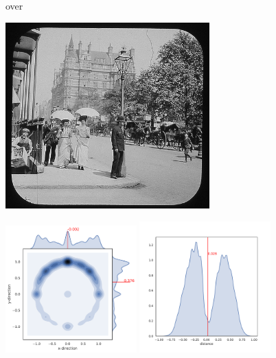 \begin{figure}
	\begin{minipage}{0.1\textwidth}
		\centering
		over
	\end{minipage}%
	\begin{minipage}{0.3\textwidth}
		\centering
		\includegraphics[width=0.7\textwidth]{studies/sc2020/figures/2370756_umbrella_over_woman.jpg}
	\end{minipage}%
	\begin{minipage}{0.6\textwidth}
		\centering
		\includegraphics[width=0.45\textwidth]{studies/sc2020/figures/over_xy.pdf}
		\includegraphics[width=0.45\textwidth]{studies/sc2020/figures/over_d.pdf}

\end{minipage}
\end{figure}
